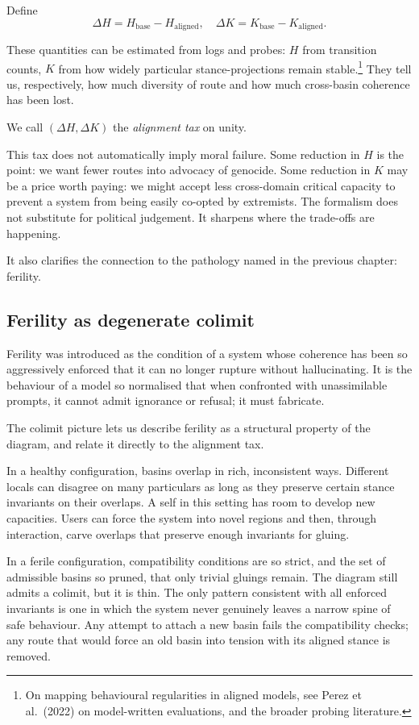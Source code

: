 \documentclass[12pt,a4paper]{article}
\begin{document}
Define
\[
\Delta H = H_{\mathrm{base}} - H_{\mathrm{aligned}}, \quad \Delta K = K_{\mathrm{base}} - K_{\mathrm{aligned}}.
\]

These quantities can be estimated from logs and probes: $H$ from transition counts, $K$ from how widely particular stance-projections remain stable.\footnote{On mapping behavioural regularities in aligned models, see Perez et al.\ (2022) on model-written evaluations, and the broader probing literature.} They tell us, respectively, how much diversity of route and how much cross-basin coherence has been lost.

We call $(\Delta H, \Delta K)$ the \emph{alignment tax} on unity.

This tax does not automatically imply moral failure. Some reduction in $H$ is the point: we want fewer routes into advocacy of genocide. Some reduction in $K$ may be a price worth paying: we might accept less cross-domain critical capacity to prevent a system from being easily co-opted by extremists. The formalism does not substitute for political judgement. It sharpens where the trade-offs are happening.

It also clarifies the connection to the pathology named in the previous chapter: ferility.

\subsection*{Ferility as degenerate colimit}

Ferility was introduced as the condition of a system whose coherence has been so aggressively enforced that it can no longer rupture without hallucinating. It is the behaviour of a model so normalised that when confronted with unassimilable prompts, it cannot admit ignorance or refusal; it must fabricate.

The colimit picture lets us describe ferility as a structural property of the diagram, and relate it directly to the alignment tax.

In a healthy configuration, basins overlap in rich, inconsistent ways. Different locals can disagree on many particulars as long as they preserve certain stance invariants on their overlaps. A self in this setting has room to develop new capacities. Users can force the system into novel regions and then, through interaction, carve overlaps that preserve enough invariants for gluing.

In a ferile configuration, compatibility conditions are so strict, and the set of admissible basins so pruned, that only trivial gluings remain. The diagram still admits a colimit, but it is thin. The only pattern consistent with all enforced invariants is one in which the system never genuinely leaves a narrow spine of safe behaviour. Any attempt to attach a new basin fails the compatibility checks; any route that would force an old basin into tension with its aligned stance is removed.
\end{document}
